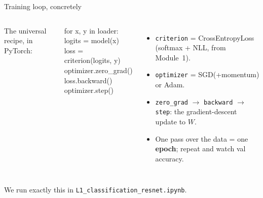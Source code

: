 \documentclass[
11pt,notheorems,hyperref={pdfauthor=whatever}
]{beamer}
\begin{document}
\begin{frame}{Training loop, concretely}
\small
\begin{columns}[c,onlytextwidth]
    The universal recipe, in PyTorch:
    \begin{tcolorbox}[colback=black, colframe=accTeal!60!black, coltext=white,
        arc=3pt, boxrule=1pt, fontupper=\scriptsize\ttfamily]
    for x, y in loader:\\
    \hspace*{1.5em}logits = model(x)\\
    \hspace*{1.5em}loss = criterion(logits, y)\\
    \hspace*{1.5em}optimizer.zero\_grad()\\
    \hspace*{1.5em}loss.backward()\\
    \hspace*{1.5em}optimizer.step()
    \end{tcolorbox}

    \begin{itemize}\setlength\itemsep{0.45em}
        \item \texttt{criterion} = \alert{CrossEntropyLoss} (softmax + NLL, from Module~1).
        \item \texttt{optimizer} = SGD(+momentum) or Adam.
        \item \texttt{zero\_grad} $\to$ \texttt{backward} $\to$ \texttt{step}: the gradient-descent
              update to $W$.
        \item One pass over the data = one \textbf{epoch}; repeat and watch val accuracy.
    \end{itemize}
\end{columns}
\vfill
{\footnotesize \textcolor{gray!55}{We run exactly this in \texttt{L1\_classification\_resnet.ipynb}.}}
\end{frame}
\end{document}
